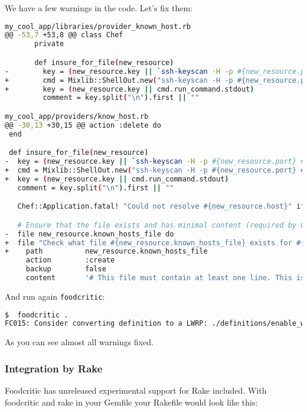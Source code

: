 We have a few warnings in the code. Let's fix them:

\begin{lstlisting}[language=Bash,label=lst:testing-foodcritic3]
my_cool_app/libraries/provider_known_host.rb
@@ -53,7 +53,8 @@ class Chef
       private

       def insure_for_file(new_resource)
-        key = (new_resource.key || `ssh-keyscan -H -p #{new_resource.port} #{new_resource.host} 2>&1`)
+        cmd = Mixlib::ShellOut.new("ssh-keyscan -H -p #{new_resource.port} #{new_resource.host} 2>&1")
+        key = (new_resource.key || cmd.run_command.stdout)
         comment = key.split("\n").first || ""

my_cool_app/providers/know_host.rb
@@ -30,13 +30,15 @@ action :delete do
 end

 def insure_for_file(new_resource)
-  key = (new_resource.key || `ssh-keyscan -H -p #{new_resource.port} #{new_resource.host} 2>&1`)
+  cmd = Mixlib::ShellOut.new("ssh-keyscan -H -p #{new_resource.port} #{new_resource.host} 2>&1")
+  key = (new_resource.key || cmd.run_command.stdout)
   comment = key.split("\n").first || ""

   Chef::Application.fatal! "Could not resolve #{new_resource.host}" if key =~ /getaddrinfo/

   # Ensure that the file exists and has minimal content (required by Chef::Util::FileEdit)
-  file new_resource.known_hosts_file do
+  file "Check what file #{new_resource.known_hosts_file} exists for #{new_resource.name}" do
+    path          new_resource.known_hosts_file
     action        :create
     backup        false
     content       '# This file must contain at least one line. This is that line.'
\end{lstlisting}

And run again \lstinline!foodcritic!:

\begin{lstlisting}[language=Bash,label=lst:testing-foodcritic4]
$  foodcritic .
FC015: Consider converting definition to a LWRP: ./definitions/enable_web_site.rb:1
\end{lstlisting}

As you can see almost all warnings fixed.

\subsubsection{Integration by Rake}

Foodcritic has unreleased experimental support for Rake included. With foodcritic and rake in your Gemfile your Rakefile would look like this:

